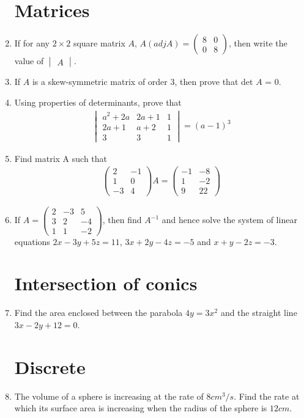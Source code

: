 \documentclass[10pt,-letter paper]{article}
\providecommand{\brak}[1]{\ensuremath{\left(#1\right)}}
\newcommand{\myvec}[1]{\ensuremath{\begin{pmatrix}#1\end{pmatrix}}}
\newcommand{\mydet}[1]{\ensuremath{\begin{vmatrix}#1\end{vmatrix}}}
\providecommand{\mydet}[1]{\ensuremath{\begin{vmatrix}#1\end{vmatrix}}}
\providecommand{\myvec}[1]{\ensuremath{\begin{bmatrix}#1\end{bmatrix}}}
\begin{document}
\begin{enumerate}
\section{Matrices}
\item If for any ${2}\times{2}$ square matrix $A$, $A\brak{adj A} = \myvec { 8 & 0 \\ 0 & 8 }$, then write the value of $\mydet{A}$.
\item If $A$ is a skew-symmetric matrix of order 3, then prove that det $A$ = 0.
\item Using properties of determinants, prove that
\begin{align*}
\mydet{{a}^{2}+2a & 2a+1 & 1 \\2a+1 & a+2 & 1 \\3 & 3 & 1} = \brak{a-1}^3
\end{align*}
\item Find matrix A such that
\begin{align*}
\myvec{2 & -1 \\1 & 0 \\-3 & 4}A=\myvec{-1 & -8 \\1 & -2 \\9 & 22} 
\end{align*}
\item If $A = \myvec{ 2 & -3 & 5 \\ 3 & 2 & -4 \\ 1 & 1 & -2 }$, then find ${A}^{-1}$ and hence solve the system of linear equations $2x-3y+5z = 11$, $3x+2y-4z = -5$ and $x+y-2z = -3$.
\section{Intersection of conics}
\item Find the area enclosed between the parabola $4y = 3{x}^{2}$ and the straight line $3x-2y+12 = 0$.
\section{Discrete}
\item The volume of a sphere is increasing at the rate of $8{cm}^{3}/s$. Find the rate at which its surface area is increasing when the radius of the sphere is $12 {cm}$.

\end{enumerate}
\end{document}
